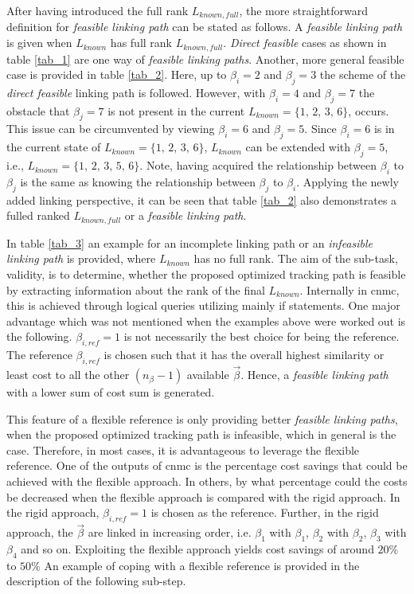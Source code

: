 After having introduced the full rank $L_{known, full}$, the more straightforward definition for \emph{feasible linking path} can be stated as follows. 
A \emph{feasible linking path} is given when $L_{known}$ has full rank $L_{known, full}$. \emph{Direct feasible} cases as shown in table \ref{tab_1} are one way of \emph{feasible linking paths}. Another, more general feasible case is provided in table \ref{tab_2}. Here, up to $\beta_i = 2$ and $\beta_j = 3$ the scheme of the \emph{direct feasible} linking path is followed.
However, with $\beta_i = 4$ and $\beta_j = 7$ the obstacle that $\beta_j = 7$ is not present in the current $L_{known}= \{1,\, 2,\, 3,\, 6\}$, occurs. 
This issue can be circumvented by viewing $\beta_i = 6$ and $\beta_j = 5$.
Since $\beta_i = 6$  is in the current state of $L_{known}= \{1,\, 2,\, 3,\, 6\}$, $L_{known}$ can be extended with $\beta_j = 5$, i.e., $L_{known}= \{1,\, 2,\, 3,\, 5, \, 6\}$. 
Note, having acquired the relationship between $\beta_i$ to $\beta_j$ is the same as knowing the relationship between $\beta_j$ to $\beta_i$.
Applying the newly added linking perspective, it can be seen that table \ref{tab_2} also demonstrates a fulled ranked $L_{known, full}$  or a  \emph{feasible linking path}.\newline

In table \ref{tab_3} an example for an incomplete linking path or an \emph{infeasible linking path} is provided, where $L_{known}$ has no full rank.
The aim of the sub-task, validity, is to determine, whether the proposed optimized tracking path is feasible by extracting information about the rank of the final $L_{known}$. 
Internally in \gls{cnmc}, this is achieved through logical queries utilizing mainly if statements.
One major advantage which was not mentioned when the examples above were worked out is the following. $\beta_{i,ref} = 1$ is not necessarily the best choice for being the reference. 
The reference $\beta_{i,ref}$ is chosen such that it has the overall highest similarity or least cost to all the other $(n_{\beta} -1)$ available $\vec{\beta}$.
Hence, a \emph{feasible linking path} with a lower sum of cost sum is generated.\newline 

This feature of a flexible reference is only providing better \emph{feasible linking paths}, when the proposed optimized tracking path is infeasible, which in general is the case. Therefore, in most cases, it is advantageous to leverage the flexible reference.
One of the outputs of \gls{cnmc} is the percentage cost savings that could be achieved with the flexible approach. In others, by what percentage could the costs be decreased when the flexible approach is compared with the rigid approach. 
In the rigid approach, $\beta_{i,ref} = 1$ is chosen as the reference.
Further, in the rigid approach, the $\vec{\beta}$ are linked in increasing order, i.e. $\beta_1$ with $\beta_1$, $\beta_2$  with $\beta_2$, $\beta_3$  with $\beta_4$ and so on. Exploiting the flexible approach yields cost savings of around $20\%$ to $50\%$ An example of coping with a flexible reference is provided in the description of the following sub-step.
\newline


